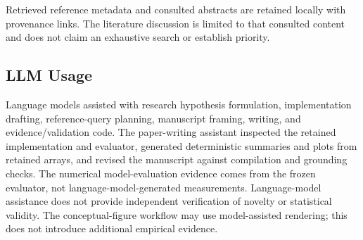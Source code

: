 \documentclass{article}
\begin{document}
Retrieved reference metadata and consulted abstracts are retained locally with provenance links. The literature discussion is limited to that consulted content and does not claim an exhaustive search or establish priority.

\subsection{LLM Usage}
Language models assisted with research hypothesis formulation, implementation drafting, reference-query planning, manuscript framing, writing, and evidence/validation code. The paper-writing assistant inspected the retained implementation and evaluator, generated deterministic summaries and plots from retained arrays, and revised the manuscript against compilation and grounding checks. The numerical model-evaluation evidence comes from the frozen evaluator, not language-model-generated measurements. Language-model assistance does not provide independent verification of novelty or statistical validity. The conceptual-figure workflow may use model-assisted rendering; this does not introduce additional empirical evidence.
\end{document}
